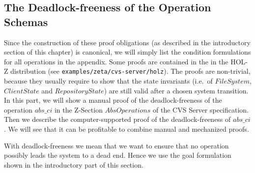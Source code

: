 \subsection{The Deadlock-freeness of the Operation Schemas}
Since the construction of these proof obligations (as described in the
introductory section of this chapter) is canonical, we will simply list the
condition formulations for all operations in the appendix. Some proofs are
contained in the in the HOL-Z distribution (see
\verb+examples/zeta/cvs-server/holz+). The proofs are non-trivial, because they
usually require to show that the state invariants (i.e.\  of
$FileSystem$,$ClientState$ and $RepositoryState$) are still valid after a chosen
system transition.
%
%
%
%
%
%
In this part, we will show a manual proof of the deadlock-freeness of the
operation $abs\_ci$ in the Z-Section $AbsOperations$ of the CVS Server
specification. Then we describe the computer-supported proof of the
deadlock-freeness of $abs\_ci$. We will see that it can be profitable to combine
manual and mechanized proofs.

With deadlock-freeness we mean that we want to ensure that no
operation possibly leads the system to a dead end. Hence we use the
goal formulation shown in the introductory part of this section. 

